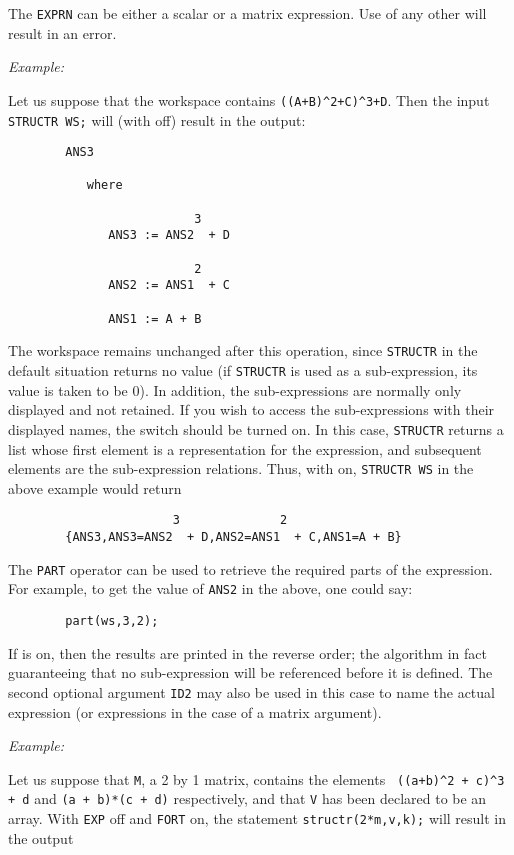 The \texttt{EXPRN} can be either a scalar or a matrix expression.  Use of any
other will result in an error.

\textit{Example:}

Let us suppose that the workspace contains
\texttt{((A+B)\textasciicircum2+C)\textasciicircum3+D}.
Then the input \texttt{STRUCTR WS;} will (with  off) result in the
output:
\begin{verbatim}
        ANS3

           where

                          3
              ANS3 := ANS2  + D

                          2
              ANS2 := ANS1  + C

              ANS1 := A + B
\end{verbatim}
\hypertarget{switch:SAVESTRUCTR}{}
The workspace remains unchanged after this operation, since \texttt{STRUCTR}
 in the default situation returns
no value (if \texttt{STRUCTR} is used as a sub-expression, its value is taken
to be 0).  In addition, the sub-expressions are normally only displayed
and not retained. If you wish to access the sub-expressions with their
displayed names, the switch  should be
turned on.  In this case, \texttt{STRUCTR} returns a list whose first element
is a representation for the expression, and subsequent elements are the
sub-expression relations.  Thus, with  on, \texttt{STRUCTR WS}
in the above example would return
\begin{verbatim}
                       3              2
        {ANS3,ANS3=ANS2  + D,ANS2=ANS1  + C,ANS1=A + B}
\end{verbatim}
The \texttt{PART} operator can
be used to retrieve the required parts of the expression.  For example, to
get the value of \texttt{ANS2} in the above, one could say:
\begin{verbatim}
        part(ws,3,2);
\end{verbatim}
If  is on, then the results are printed in the reverse order; the
algorithm in fact guaranteeing that no sub-expression will be referenced
before it is defined.  The second optional argument \texttt{ID2} may also be
used in this case to name the actual expression (or expressions in the
case of a matrix argument).

\textit{Example:}

Let us suppose that \texttt{M}, a 2 by 1 matrix, contains the elements {\tt
((a+b)\verb|^|2 + c)\verb|^|3 + d} and \texttt{(a + b)*(c + d)} respectively,
and that \texttt{V} has been declared to be an array.  With \texttt{EXP} off and
\texttt{FORT} on, the statement \texttt{structr(2*m,v,k);} will result in the output

